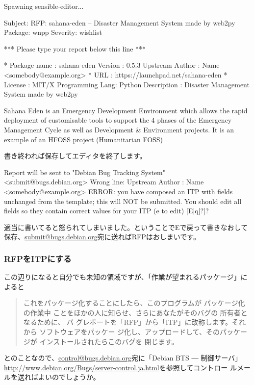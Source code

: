 \documentclass[mingoth,a4paper]{jsarticle}
\begin{document}
\begin{commandline}
Spawning sensible-editor...

Subject: RFP: sahana-eden -- Disaster Management System made by web2py
Package: wnpp
Severity: wishlist

*** Please type your report below this line ***

* Package name    : sahana-eden
  Version         : 0.5.3
  Upstream Author : Name <somebody@example.org>
* URL             : https://launchpad.net/sahana-eden
* License         : MIT/X
  Programming Lang: Python
  Description     : Disaster Management System made by web2py

Sahana Eden is an Emergency Development Environment which allows the
rapid deployment of customisable tools to support the 4 phases of the
Emergency Management Cycle as well as Development & Environment
projects. It is an example of an HFOSS project (Humanitarian FOSS)
\end{commandline}
書き終われば保存してエディタを終了します。

\begin{commandline}
Report will be sent to "Debian Bug Tracking System" <submit@bugs.debian.org>
Wrong line:   Upstream Author : Name <somebody@example.org>
ERROR: you have composed an ITP with fields unchanged from the template; this will NOT be submitted. You should
edit all fields so they contain correct values for your ITP (e to edit) [E|q|?]?
\end{commandline}
適当に書いてると怒られてしまいました。ということでEで戻って書きなおして
保存、\url{submit@bugs.debian.org}宛に送ればRFPはおしまいです。

\subsubsection{RFPをITPにする}
この辺りになると自分でも未知の領域ですが、「作業が望まれるパッケージ」に
よると

\begin{quote}
これをパッケージ化することにしたら、このプログラムが パッケージ化の作業中
ことをほかの人に知らせ、さらにあなたがそのバグの 所有者となるために、 バ
グレポートを「RFP」から「ITP」に改称します。それから ソフトウェアをパッケー
ジ化し、アップロードして、そのパッケージが インストールされたらこのバグを
閉じます。
\end{quote}

とのことなので、\url{control@bugs.debian.org}宛に「Debian BTS ― 制御サーバ」
\url{http://www.debian.org/Bugs/server-control.ja.html}を参照してコントロー
ルメールを送ればよいのでしょうか。
\end{document}
